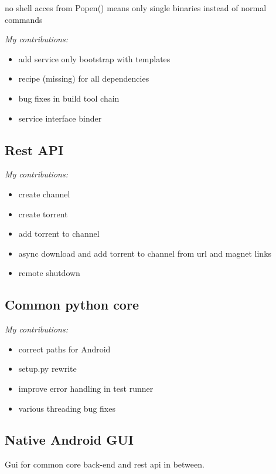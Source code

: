 no shell acces from Popen() means only single binaries instead of normal commands

\emph{My contributions:}
\begin{itemize}
	\item add service only bootstrap with templates
	\item recipe (missing) for all dependencies
	\item bug fixes in build tool chain
	\item service interface binder
\end{itemize}


\subsection{Rest API}

\emph{My contributions:}
\begin{itemize}
	\item create channel
	\item create torrent
	\item add torrent to channel
	\item async download and add torrent to channel from url and magnet links
	\item remote shutdown
\end{itemize}

\subsection{Common python core}

\emph{My contributions:}
\begin{itemize}
	\item correct paths for Android
	\item setup.py rewrite
	\item improve error handling in test runner
	\item various threading bug fixes
\end{itemize}


\subsection{Native Android GUI}
Gui for common core back-end and rest api in between.

